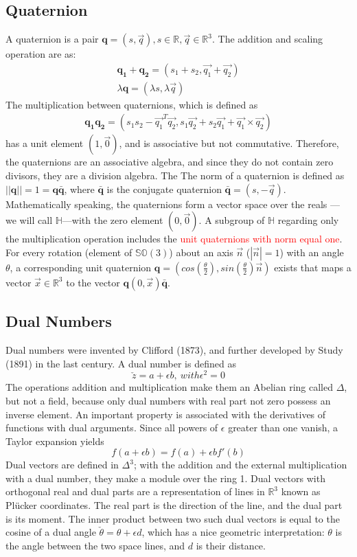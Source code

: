 \subsection{Quaternion}
A quaternion is a pair $\mathbf{q} = (s, \vec{q}), s\in \mathbb{R}, \vec{q} \in \mathbb{R}^3$. The addition and scaling operation are as:
\begin{align}
\mathbf{q_1}+\mathbf{q_2}=(s_1+s_2,\vec{q_1}+\vec{q_2})\\
\lambda\mathbf{q}=(\lambda s, \lambda \vec{q}) 
\end{align}
The multiplication between quaternions, which is defined as
\begin{align}
\mathbf{q_1}\mathbf{q_2}=(s_1s_2-\vec{q_1}^T\vec{q_2}, s_1\vec{q_2}+s_2\vec{q_1}+\vec{q_1}\times\vec{q_2})
\end{align}
has a unit element $(1, \vec{0})$, and is associative but not commutative. Therefore, the quaternions are an associative algebra, and since they do not contain zero divisors, they are a division algebra. The The norm of a quaternion is defined as $||\mathbf{q}||=1=\mathbf{q}\bar{\mathbf{q}}$, where $\bar{\mathbf{q}}$ is the conjugate quaternion $\bar{\mathbf{q}}=(s,-\vec{q})$. Mathematically speaking, the quaternions form a vector space over the reals — we will call $\mathbb{H}$—with the zero element $(0, \vec{0})$. A subgroup of $\mathbb{H}$ regarding only the multiplication operation includes the \textcolor{red}{unit quaternions with norm equal one}. For every rotation (element of $\mathbb{SO}(3)$) about an axis $\vec{n}$
($|\vec{n}|=1$) with an angle $\theta$, a corresponding unit quaternion $\mathbf{q}=(cos(\frac{\theta}{2}),sin(\frac{\theta}{2})\vec{n})$ exists that maps a vector $\vec{x} \in \mathbb{R}^3$ to the vector $\mathbf{q}(0, \vec{x})\bar{\mathbf{q}}$.
\subsection{Dual Numbers}
Dual numbers were invented by Clifford (1873), and further developed by Study (1891) in the last century. A dual number is defined as
$$
\check{z}=a+\epsilon b,\ with \epsilon^2=0
$$
The operations addition and multiplication make them an Abelian ring called $\Delta$, but not a field, because only dual numbers with real part not zero possess an inverse element. An important property is associated with the derivatives of functions with dual arguments. Since all powers of $\epsilon$ greater than
one vanish, a Taylor expansion yields
$$
f(a+\epsilon b)=f(a)+\epsilon bf'(b)
$$
Dual vectors are defined in $\Delta^3$; with the addition and the external multiplication with a dual number, they make a module over the ring 1. Dual vectors with orthogonal real and dual parts are a representation of lines in $\mathbb{R}^3$ known as Plücker coordinates. The real part is the direction of the line, and the
dual part is its moment. The inner product between two such
dual vectors is equal to the cosine of a dual angle $\check{\theta} = \theta+\epsilon d$, which has a nice geometric interpretation: $\theta$ is the angle between the two space lines, and $d$ is their distance.

